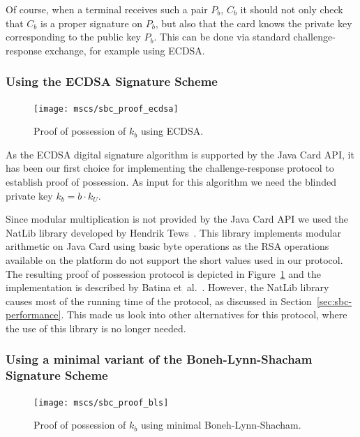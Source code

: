Of course, when a terminal receives such a pair $P_b$, $C_b$ it should not only
check that $C_b$ is a proper signature on $P_b$, but also that the card knows
the private key corresponding to the public key $P_b$. This can be done via
standard challenge-response exchange, for example using ECDSA.

\subsubsection{Using the ECDSA Signature Scheme}

\begin{figure}[t]
  \centering
  \texttt{[image: mscs/sbc\_proof\_ecdsa]}
  \caption{Proof of possession of $k_b$ using ECDSA.}
  \label{fig:SBC-proof-ECDSA}
\end{figure}

As the ECDSA digital signature algorithm is supported by the Java Card API, it
has been our first choice for implementing the challenge-response protocol to
establish proof of possession. As input for this algorithm we need the blinded
private key $k_b = b \cdot k_U$.

Since modular multiplication is not provided by the Java 
Card API we used the NatLib library developed by Hendrik 
Tews~\cite{TewsJacobs09}. This library implements modular arithmetic on Java 
Card using basic byte operations as the RSA operations 
available on the platform do not support the short values used in our protocol.
The resulting proof of possession protocol is depicted in
Figure~\ref{fig:SBC-proof-ECDSA} and the implementation is described by Batina
et~al.~\cite{BatinaHJMV10}. However, the NatLib library causes most of the 
running time of the protocol, as discussed in Section~\ref{sec:sbc-performance}.
This made us look into other alternatives for this protocol, where the use of
this library is no longer needed.

\subsubsection{Using a minimal variant of the Boneh-Lynn-Shacham Signature Scheme}

\begin{figure}[t]
  \centering
  \texttt{[image: mscs/sbc\_proof\_bls]}
  \caption{Proof of possession of $k_b$ using minimal Boneh-Lynn-Shacham.}
  \label{fig:SBC-proof-BLS}
\end{figure}

